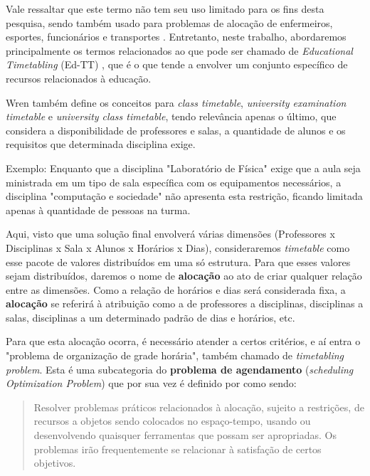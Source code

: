     Vale ressaltar que este termo não tem seu uso limitado para os fins desta pesquisa, sendo também usado para problemas de alocação de enfermeiros, esportes, funcionários e transportes \cite{arratia-martinez_university_2021}. Entretanto, neste trabalho, abordaremos principalmente os termos relacionados ao que pode ser chamado de \textit{Educational Timetabling} (Ed-TT) \cite{alencar_visualization_2019}, que é o que tende a envolver um conjunto específico de recursos relacionados à educação.


    Wren também define os conceitos para \textit{class timetable}, \textit{university examination timetable} e \textit{university class timetable}, tendo relevância apenas o último, que considera a disponibilidade de professores e salas, a quantidade de alunos e os requisitos que determinada disciplina exige.

    Exemplo: Enquanto que a disciplina "Laboratório de Física" exige que a aula seja ministrada em um tipo de sala específica com os equipamentos necessários, a disciplina "computação e sociedade" não apresenta esta restrição, ficando limitada apenas à quantidade de pessoas na turma.

    Aqui, visto que uma solução final envolverá várias dimensões (Professores x Disciplinas x Sala x Alunos x Horários x Dias), consideraremos \textit{timetable} como esse pacote de valores distribuídos em uma só estrutura. Para que esses valores sejam distribuídos, daremos o nome de \textbf{alocação} ao ato de criar qualquer relação entre as dimensões. Como a relação de horários e dias será considerada fixa, a \textbf{alocação} se referirá à atribuição como a de professores a disciplinas, disciplinas a salas, disciplinas a um determinado padrão de dias e horários, etc.

    Para que esta alocação ocorra, é necessário atender a certos critérios, e aí entra o "problema de organização de grade horária", também chamado de \textit{timetabling problem}. Esta é uma subcategoria do \textbf{problema de agendamento} (\textit{scheduling Optimization Problem}) \cite{alencar_visualization_2019} que por sua vez é definido por \cite{goos_scheduling_1996} como sendo:

    \begin{quote}\footnotesize
        Resolver problemas práticos relacionados à alocação, sujeito a restrições, de recursos a objetos sendo colocados no espaço-tempo, usando ou desenvolvendo quaisquer ferramentas que possam ser apropriadas. Os problemas irão frequentemente se relacionar à satisfação de certos objetivos.
    \end{quote}

